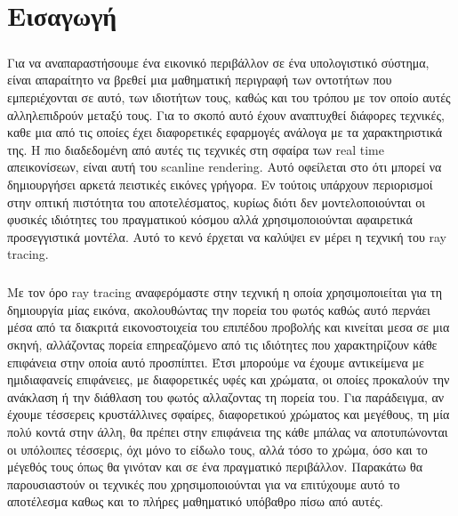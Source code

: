 \chapter{Εισαγωγή}

\ifpdf
    \graphicspath{{Introduction/IntroductionFigs/PNG/}{Introduction/IntroductionFigs/PDF/}{Introduction/IntroductionFigs/}}
\else
    \graphicspath{{Introduction/IntroductionFigs/EPS/}{Introduction/IntroductionFigs/}}
\fi

\begin{sloppypar}

\paragraph{}
Για να αναπαραστήσουμε ένα εικονικό περιβάλλον σε ένα υπολογιστικό σύστημα,
είναι απαραίτητο να βρεθεί μια μαθηματική περιγραφή των οντοτήτων που εμπεριέχονται σε αυτό, 
των ιδιοτήτων τους, καθώς και του τρόπου με τον οποίο αυτές αλληλεπιδρούν μεταξύ τους. 
Για το σκοπό αυτό έχουν αναπτυχθεί διάφορες τεχνικές, καθε μια από τις οποίες έχει διαφορετικές 
εφαρμογές ανάλογα με τα χαρακτηριστικά της. Η πιο διαδεδομένη από αυτές τις τεχνικές στη σφαίρα 
των real time απεικονίσεων, είναι αυτή του scanline rendering. Αυτό οφείλεται στο ότι μπορεί 
να δημιουργήσει αρκετά πειστικές εικόνες γρήγορα. Εν τούτοις υπάρχουν περιορισμοί στην οπτική 
πιστότητα του αποτελέσματος, κυρίως διότι δεν μοντελοποιούνται οι φυσικές ιδιότητες του πραγματικού 
κόσμου αλλά χρησιμοποιούνται αφαιρετικά προσεγγιστικά μοντέλα. Αυτό το κενό έρχεται να καλύψει 
εν μέρει η τεχνική του ray tracing.

\paragraph{}
Με τον όρο ray tracing αναφερόμαστε στην τεχνική η οποία χρησιμοποιείται για τη δημιουργία μίας
εικόνα, ακολουθώντας την πορεία του φωτός καθώς αυτό περνάει μέσα από τα διακριτά εικονοστοιχεία 
του επιπέδου προβολής και κινείται μεσα σε μια σκηνή, αλλάζοντας πορεία επηρεαζόμενο από τις 
ιδιότητες που χαρακτηρίζουν κάθε επιφάνεια στην οποία αυτό προσπίπτει. Έτσι μπορούμε να έχουμε 
αντικείμενα με ημιδιαφανείς επιφάνειες, με διαφορετικές υφές και χρώματα, οι οποίες προκαλούν 
την ανάκλαση ή την διάθλαση του φωτός αλλαζοντας τη πορεία του. Για παράδειγμα, αν έχουμε τέσσερεις 
κρυστάλλινες σφαίρες, διαφορετικού χρώματος και μεγέθους, τη μία πολύ κοντά στην άλλη, θα πρέπει 
στην επιφάνεια της κάθε μπάλας να αποτυπώνονται οι υπόλοιπες τέσσερις, όχι μόνο το είδωλο τους, 
αλλά τόσο το χρώμα, όσο και το μέγεθός τους όπως θα γινόταν και σε ένα πραγματικό περιβάλλον. 
Παρακάτω θα παρουσιαστούν οι τεχνικές που χρησιμοποιούνται για να επιτύχουμε αυτό το αποτέλεσμα 
καθως και το πλήρες μαθηματικό υπόβαθρο πίσω από αυτές.

\end{sloppypar}

